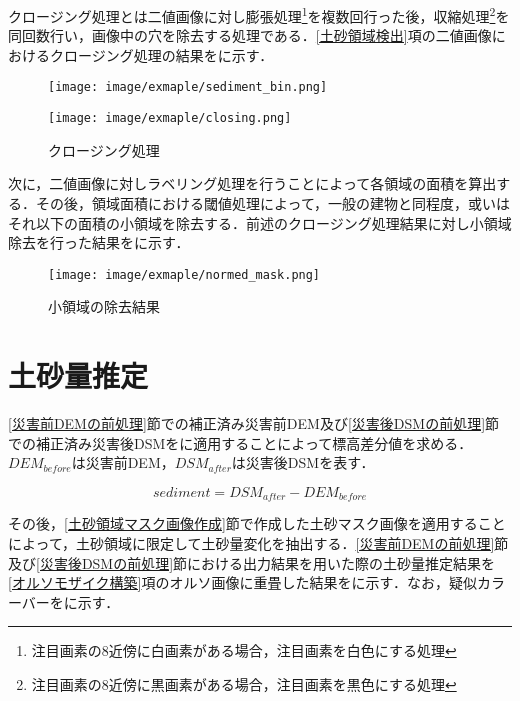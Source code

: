       クロージング処理とは二値画像に対し膨張処理\footnote{注目画素の8近傍に白画素がある場合，注目画素を白色にする処理}を複数回行った後，収縮処理\footnote{注目画素の8近傍に黒画素がある場合，注目画素を黒色にする処理}を同回数行い，画像中の穴を除去する処理である．\ref{土砂領域検出}項の二値画像におけるクロージング処理の結果をに示す．

      \begin{figure}[t]
        \begin{minipage}[c]{0.45\hsize}
          \centering
          \texttt{[image: image/exmaple/sediment\_bin.png]}
        \end{minipage}
        \begin{minipage}[c]{0.45\hsize}
          \centering
          \texttt{[image: image/exmaple/closing.png]}
        \end{minipage}
        \caption{クロージング処理}
        \label{クロージング処理結果}
      \end{figure}

      次に，二値画像に対しラベリング処理を行うことによって各領域の面積を算出する．その後，領域面積における閾値処理によって，一般の建物と同程度，或いはそれ以下の面積の小領域を除去する．前述のクロージング処理結果に対し小領域除去を行った結果をに示す．
      
      \begin{figure}[t]
        \centering
        \texttt{[image: image/exmaple/normed\_mask.png]}
        \caption{小領域の除去結果}
        \label{小領域除去}
      \end{figure}



  \section{土砂量推定}
    \label{土砂量推定}
    \ref{災害前DEMの前処理}節での補正済み災害前DEM及び\ref{災害後DSMの前処理}節での補正済み災害後DSMをに適用することによって標高差分値を求める．$DEM_{before}$は災害前DEM，$DSM_{after}$は災害後DSMを表す．
    
    \begin{equation}
      \label{土砂量推定式}
      sediment = DSM_{after} - DEM_{before}
    \end{equation}

    その後，\ref{土砂領域マスク画像作成}節で作成した土砂マスク画像を適用することによって，土砂領域に限定して土砂量変化を抽出する．\ref{災害前DEMの前処理}節及び\ref{災害後DSMの前処理}節における出力結果を用いた際の土砂量推定結果を\ref{オルソモザイク構築}項のオルソ画像に重畳した結果をに示す．なお，疑似カラーバーをに示す．

